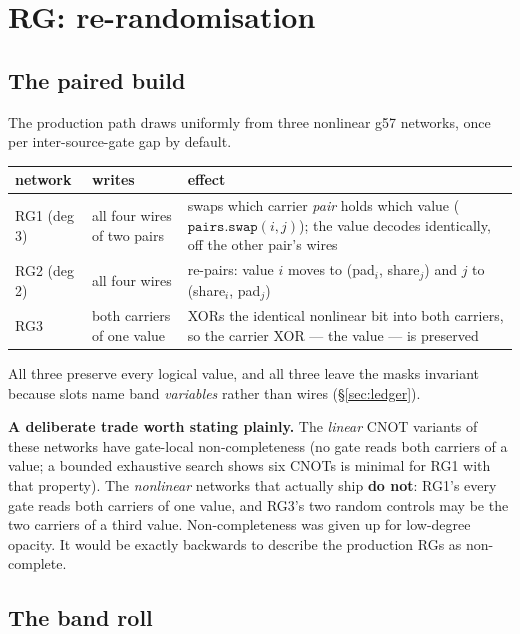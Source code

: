 \documentclass[11pt]{article}
\newcommand{\code}[1]{\texttt{#1}}
\begin{document}
\section{RG: re-randomisation}
\label{sec:rg}

\subsection{The paired build}

The production path draws uniformly from three nonlinear g57 networks, once per
inter-source-gate gap by default.

\begin{center}
\begin{tabular}{llp{}}
\toprule
network & writes & effect \\
\midrule
RG1 (deg 3) & all four wires of two pairs & swaps which carrier \emph{pair} holds which value ($\code{pairs.swap}(i,j)$); the value decodes identically, off the other pair's wires \\
RG2 (deg 2) & all four wires & re-pairs: value $i$ moves to (pad$_i$, share$_j$) and $j$ to (share$_i$, pad$_j$) \\
RG3 & both carriers of one value & XORs the identical nonlinear bit into both carriers, so the carrier XOR --- the value --- is preserved \\
\bottomrule
\end{tabular}
\end{center}

All three preserve every logical value, and all three leave the masks invariant
because slots name band \emph{variables} rather than wires (\S\ref{sec:ledger}).

\textbf{A deliberate trade worth stating plainly.} The \emph{linear} CNOT
variants of these networks have gate-local non-completeness (no gate reads both
carriers of a value; a bounded exhaustive search shows six CNOTs is minimal for
RG1 with that property). The \emph{nonlinear} networks that actually ship
\textbf{do not}: RG1's every gate reads both carriers of one value, and RG3's
two random controls may be the two carriers of a third value. Non-completeness
was given up for low-degree opacity. It would be exactly backwards to describe
the production RGs as non-complete.

\subsection{The band roll}
\end{document}
